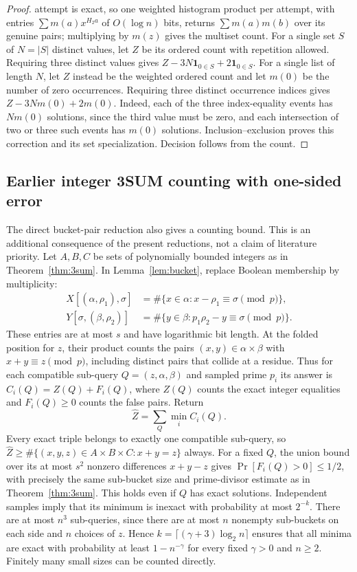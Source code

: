 \documentclass[11pt]{article}
\begin{document}
\begin{proof}
attempt is exact, so one weighted histogram product per attempt, with
entries $\sum m(a)x^{H_2a}$ of $O(\log n)$ bits, returns
$\sum m(a)m(b)$ over its genuine pairs; multiplying by $m(z)$ gives the
multiset count. For a single set $S$ of $N=|S|$ distinct values, let $Z$
be its ordered count with repetition allowed. Requiring three distinct
values gives $Z-3N\mathbf 1_{0\in S}+2\mathbf 1_{0\in S}$.
For a single list of length $N$, let $Z$ instead be the weighted ordered
count and let $m(0)$ be the number of zero occurrences. Requiring three
distinct occurrence indices gives $Z-3Nm(0)+2m(0)$. Indeed, each of the
three index-equality events has $Nm(0)$ solutions, since the third value
must be zero, and each intersection of two or three such events has
$m(0)$ solutions. Inclusion--exclusion proves this correction and its
set specialization.
Decision follows from the count.
\end{proof}

\subsection*{Earlier integer 3SUM counting with one-sided error}
The direct bucket-pair reduction also gives a counting bound. This is an
additional consequence of the present reductions, not a claim of literature
priority. Let $A,B,C$ be sets of polynomially bounded integers as in
Theorem~\ref{thm:3sum}. In Lemma~\ref{lem:bucket}, replace Boolean membership
by multiplicity:
\begin{align*}
X[(\alpha,\rho_1),\sigma]
 &=\#\{x\in\alpha:x-\rho_1\equiv\sigma\pmod p\},\\
Y[\sigma,(\beta,\rho_2)]
 &=\#\{y\in\beta:p_1\rho_2-y\equiv\sigma\pmod p\}.
\end{align*}
These entries are at most $s$ and have logarithmic bit length. At the folded
position for $z$, their product counts the pairs $(x,y)\in\alpha\times\beta$
with $x+y\equiv z\pmod p$, including distinct pairs that collide at a
residue. Thus for each compatible sub-query $Q=(z,\alpha,\beta)$ and sampled
prime $p_i$ its answer is $C_i(Q)=Z(Q)+F_i(Q)$, where $Z(Q)$ counts the exact
integer equalities and $F_i(Q)\ge0$ counts the false pairs. Return
\[
\widehat Z=\sum_Q\min_i C_i(Q).
\]
Every exact triple belongs to exactly one compatible sub-query, so
$\widehat Z\ge\#\{(x,y,z)\in A\times B\times C:x+y=z\}$ always.
For a fixed $Q$, the union bound over its at most $s^2$ nonzero differences
$x+y-z$ gives $\Pr[F_i(Q)>0]\le1/2$, with precisely the same sub-bucket size
and prime-divisor estimate as in Theorem~\ref{thm:3sum}. This holds even if
$Q$ has exact solutions. Independent samples imply that its minimum is
inexact with probability at most $2^{-k}$. There are at most $n^3$
sub-queries, since there are at most $n$ nonempty sub-buckets on each side
and $n$ choices of $z$. Hence
$k=\lceil(\gamma+3)\log_2 n\rceil$ ensures that all minima are exact with
probability at least $1-n^{-\gamma}$ for every fixed $\gamma>0$ and $n\ge2$.
Finitely many small sizes can be counted directly.
\end{document}
